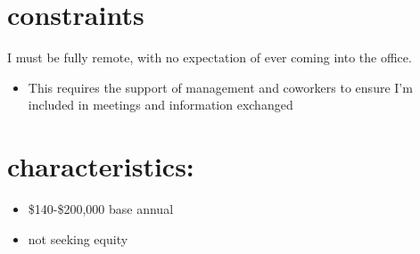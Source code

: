\documentclass[14pt,letterpaper,sans]{moderncv} %
\begin{document}
\hypertarget{constraints}{%
\section{constraints}\label{constraints}}

I must be fully remote, with no expectation of ever coming into the office.

\begin{itemize}
\item
  This requires the support of management and coworkers to ensure I'm included in meetings and information exchanged
\end{itemize}

\hypertarget{characteristics}{%
\section{characteristics:}\label{characteristics}}

\begin{itemize}
\item
  \$140-\$200,000 base annual
\item
  not seeking equity
\end{itemize}


\newpage






\end{document}
